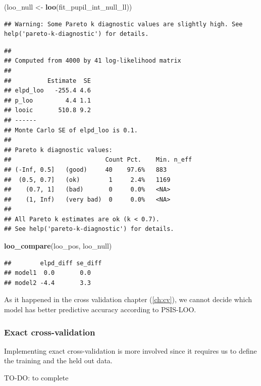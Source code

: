 \documentclass[12pt,]{krantz}
\newenvironment{Shaded}{\begin{snugshade}}{\end{snugshade}}
\newcommand{\KeywordTok}[1]{\textcolor[rgb]{0.13,0.29,0.53}{\textbf{#1}}}
\newcommand{\StringTok}[1]{\textcolor[rgb]{0.31,0.60,0.02}{#1}}
\newcommand{\NormalTok}[1]{#1}
\theoremstyle{definition}
\theoremstyle{definition}
\theoremstyle{definition}
\theoremstyle{remark}
\begin{document}
\begin{Shaded}
\begin{Highlighting}[]
\NormalTok{(loo_null <-}\StringTok{ }\KeywordTok{loo}\NormalTok{(fit_pupil_int_null_ll))}
\end{Highlighting}
\end{Shaded}

\begin{verbatim}
## Warning: Some Pareto k diagnostic values are slightly high. See help('pareto-k-diagnostic') for details.
\end{verbatim}

\begin{verbatim}
## 
## Computed from 4000 by 41 log-likelihood matrix
## 
##          Estimate  SE
## elpd_loo   -255.4 4.6
## p_loo         4.4 1.1
## looic       510.8 9.2
## ------
## Monte Carlo SE of elpd_loo is 0.1.
## 
## Pareto k diagnostic values:
##                          Count Pct.    Min. n_eff
## (-Inf, 0.5]   (good)     40    97.6%   883       
##  (0.5, 0.7]   (ok)        1     2.4%   1169      
##    (0.7, 1]   (bad)       0     0.0%   <NA>      
##    (1, Inf)   (very bad)  0     0.0%   <NA>      
## 
## All Pareto k estimates are ok (k < 0.7).
## See help('pareto-k-diagnostic') for details.
\end{verbatim}

\begin{Shaded}
\begin{Highlighting}[]
\KeywordTok{loo_compare}\NormalTok{(loo_pos, loo_null)}
\end{Highlighting}
\end{Shaded}

\begin{verbatim}
##        elpd_diff se_diff
## model1  0.0       0.0   
## model2 -4.4       3.3
\end{verbatim}

As it happened in the cross validation chapter (\ref{ch:cv}), we cannot
decide which model has better predictive accuracy according to PSIS-LOO.

\subsubsection{Exact cross-validation}\label{exact-cross-validation}

Implementing exact cross-validation is more involved since it requires
us to define the training and the held out data.

TO-DO: to complete
\end{document}
